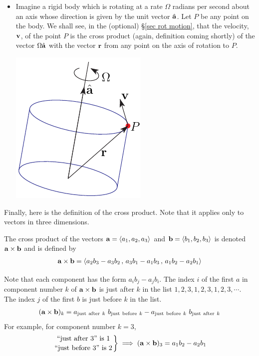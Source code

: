 \begin{itemize}
\item 
Imagine a rigid body which is rotating at a rate $\Omega$ radians per 
second about an axis whose direction is given by the unit vector $\hat{\mathbf{a}}$. 
Let $P$ be any point on the body. We shall see, in the (optional)
\S\ref{sec rot motion}, that the velocity, $\mathbf{v}$, of the point $P$ 
is the cross product 
(again, definition coming shortly) of the vector $\Omega\hat{\mathbf{a}}$ with the vector
$\mathbf{r}$ from any point on the axis of rotation to $P$.
      \begin{nfig} 
      \begin{center}
      \includegraphics{rigidBB}
      \end{center}
      \end{nfig}
\end{itemize}

\noindent
Finally, here is the definition of the cross product. Note that it applies only to vectors in three dimensions.

\begin{defn}\label{def:crossProd}
The cross product of the vectors $\mathbf{a}=\left< a_1,a_2,a_3\right>$ and 
$\mathbf{b}=\left< b_1,b_2,b_3\right>$ is denoted $\mathbf{a}\times\mathbf{b}$ 
and is defined by
\begin{align*}
\mathbf{a}\times\mathbf{b} = \left< a_2b_3-a_3b_2\,,\, a_3b_1-a_1b_3\,,\, a_1b_2-a_2b_1\right> 
\end{align*}
\end{defn}

Note that each component has the form $a_ib_j-a_jb_i$. The index $i$ of
the first $a$ in component number $k$ of $\mathbf{a}\times\mathbf{b}$
is just after $k$ in the list $1,2,3,1,2,3,1,2,3,\cdots$. 
The index $j$ of the first $b$ is just before $k$ in the list. 
\begin{align*}
(\mathbf{a}\times\mathbf{b})_k
=a_{{\rm just\  after\  }k}\ b_{{\rm just\  before\  }k}
-a_{{\rm just\  before\  }k}\ b_{{\rm just\  after\  }k}
\end{align*}
For example, for component number $k=3$,
\begin{align*}
\left.{\text{``just after 3'' is 1}}\atop{\text{``just before 3'' is 2}}\right\}
\implies (\mathbf{a}\times\mathbf{b})_3= a_1b_2-a_2b_1
\end{align*}


